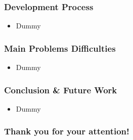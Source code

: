 \documentclass{beamer}
\begin{document}
\begin{frame}
\frametitle{Development Process}
\begin{itemize}
 \item Dummy
\end{itemize}
\end{frame}


\begin{frame}
\frametitle{Main Problems Difficulties}
\begin{itemize}
 \item Dummy
\end{itemize}
\end{frame}


\begin{frame}
\frametitle{Conclusion \& Future Work}
\begin{itemize}
 \item Dummy
\end{itemize}
\end{frame}




\begin{frame}
\begin{center}
\frametitle{Thank you for your attention!}
\end{center}
\end{frame}
\end{document}
